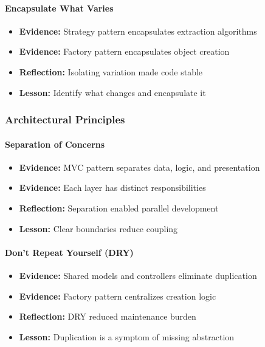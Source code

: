 \documentclass[11pt, a4paper]{article}
\theoremstyle{plain}
\theoremstyle{definition}
\begin{document}
\paragraph{Encapsulate What Varies}
\begin{itemize}
    \item \textbf{Evidence:} Strategy pattern encapsulates extraction algorithms
    \item \textbf{Evidence:} Factory pattern encapsulates object creation
    \item \textbf{Reflection:} Isolating variation made code stable
    \item \textbf{Lesson:} Identify what changes and encapsulate it
\end{itemize}

\subsubsection{Architectural Principles}

\paragraph{Separation of Concerns}
\begin{itemize}
    \item \textbf{Evidence:} MVC pattern separates data, logic, and presentation
    \item \textbf{Evidence:} Each layer has distinct responsibilities
    \item \textbf{Reflection:} Separation enabled parallel development
    \item \textbf{Lesson:} Clear boundaries reduce coupling
\end{itemize}

\paragraph{Don't Repeat Yourself (DRY)}
\begin{itemize}
    \item \textbf{Evidence:} Shared models and controllers eliminate duplication
    \item \textbf{Evidence:} Factory pattern centralizes creation logic
    \item \textbf{Reflection:} DRY reduced maintenance burden
    \item \textbf{Lesson:} Duplication is a symptom of missing abstraction
\end{itemize}
\end{document}
